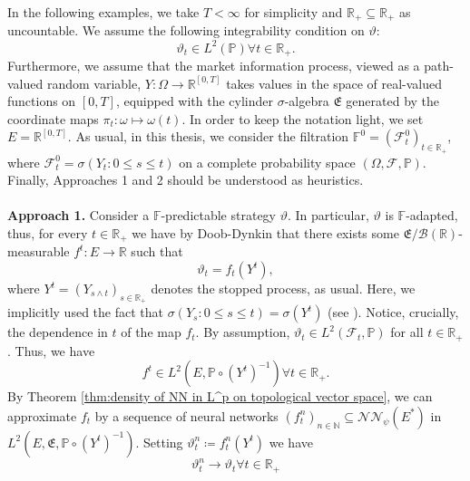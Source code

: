 \documentclass[11pt,a4paper,twoside,openany]{report}
\numberwithin{equation}{section}
\theoremstyle{plain} %
\theoremstyle{definition} %
\theoremstyle{remark} %
\let\parencite\authnumparencite
\begin{document}
In the following examples, we take \(T<\infty\) for simplicity and \(\mathbb{R}_+\subseteq\mathbb{R}_+\) as uncountable. We assume the following integrability condition on \(\vartheta\):
\begin{equation*}
      \vartheta_t\in L^2(\mathbb{P})\forall t\in\mathbb{R}_+.
\end{equation*}
Furthermore, we assume that the market information process, viewed as a path-valued random variable, \(Y:\Omega\to \mathbb{R}^{[0,T]}\) takes values in the space of real-valued functions on \([0,T]\), equipped with the cylinder \(\sigma\)-algebra \(\mathfrak{E}\) generated by the coordinate maps \(\pi_t:\omega\mapsto\omega(t)\). In order to keep the notation light, we set \(E=\mathbb{R}^{[0,T]}\). As usual, in this thesis, we consider the filtration \(\mathbb{F}^0=(\mathcal{F}^0_t)_{t\in\mathbb{R}_+}\), where \(\mathcal{F}^0_t=\sigma(Y_t:0\leq s\leq t )\) on a complete probability space \((\Omega,\mathcal{F},\mathbb{P})\). Finally, Approaches 1 and 2 should be understood as heuristics.
\\\\
\textbf{Approach 1.}
Consider a \(\mathbb{F}\)-predictable strategy \(\vartheta\). In particular, \(\vartheta\) is \(\mathbb{F}\)-adapted, thus, for every \(t\in\mathbb{R}_+\) we have by Doob-Dynkin that there exists some \(\mathfrak{E}/\mathcal{B}(\mathbb{R})\)-measurable \(f^t:E\to\mathbb{R}\) such that
\begin{equation*}
    \vartheta_t=f_t(Y^t),
\end{equation*}
where \(Y^t=(Y_{s\wedge t})_{s\in\mathbb{R}_+}\) denotes the stopped process, as usual. Here, we implicitly used the fact that \(\sigma(Y_s:0\leq s\leq t)=\sigma(Y^t)\) (see \parencite[Problem~4.2,p.60]{KaratzasShreve1991Brownian}). Notice, crucially, the dependence in \(t\) of the map \(f_t\). By assumption, 
\(
    \vartheta_t\in L^2(\mathcal{F}_t,\mathbb{P})
\) for all \(t\in\mathbb{R}_+\).
Thus, we have
\begin{equation*}
    f^t\in L^2(E,\mathbb{P}\circ(Y^t)^{-1})\forall t\in\mathbb{R}_+.
\end{equation*}
By Theorem \ref{thm:density of NN in L^p on topological vector space}, we can approximate \(f_t\) by a sequence of neural networks \((f_t^n)_{n\in\mathbb{N}}\subseteq\mathcal{NN}_\psi(E^*)\) in \(L^2(E,\mathfrak{E},\mathbb{P}\circ(Y^t)^{-1})\). Setting \(\vartheta^n_t\coloneqq f^n_t(Y^t)\) we have
\begin{equation*}
    \vartheta_t^n\to\vartheta_t\forall t\in\mathbb{R}_+
\end{equation*}
\end{document}
